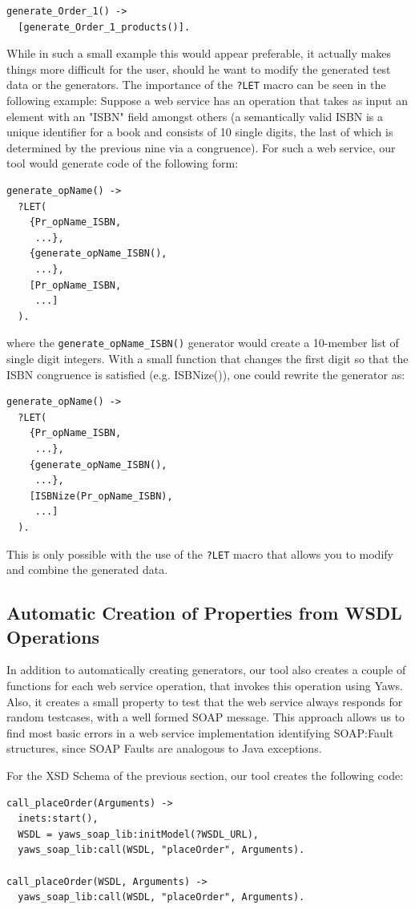 \documentclass[submission,copyright,a4]{eptcs}
\newcommand{\LET}{\texttt{?LET}\xspace}
\begin{document}
\begin{lstlisting}
generate_Order_1() ->
  [generate_Order_1_products()].
\end{lstlisting}

While in such a small example this would appear preferable, it actually makes things more 
difficult for the user, should he want to modify the generated test data or the generators. 
The importance of the \LET macro can be seen in the following example: Suppose a web service 
has an operation that takes as input an element with an "ISBN" field amongst others (a 
semantically valid ISBN is a unique identifier for a book and consists of 10 single digits, 
the last of which is determined by the previous nine via a congruence). For such a web service, 
our tool would generate code of the following form:
\begin{lstlisting}
generate_opName() ->
  ?LET(
    {Pr_opName_ISBN,
     ...},
    {generate_opName_ISBN(),
     ...},
    [Pr_opName_ISBN,
     ...]
  ).
\end{lstlisting}
where the \texttt{generate\_opName\_ISBN()} generator would create a
10-member list of single digit integers. With a small function that
changes the first digit so that the ISBN congruence is satisfied (e.g.
ISBNize()), one could rewrite the generator as:
\begin{lstlisting}
generate_opName() ->
  ?LET(
    {Pr_opName_ISBN,
     ...},
    {generate_opName_ISBN(),
     ...},
    [ISBNize(Pr_opName_ISBN),
     ...]
  ).
\end{lstlisting}

This is only possible with the use of the \LET macro that allows you to modify and combine the 
generated data. 

\subsection{Automatic Creation of Properties from WSDL Operations}

In addition to automatically creating generators, our tool also
creates a couple of functions for each web service operation, that
invokes this operation using Yaws. Also, it creates a small property
to test that the web service always responds for random testcases, with a
well formed SOAP message. This approach allows us to find most basic
errors in a web service implementation identifying SOAP:Fault
structures, since SOAP Faults are analogous to Java exceptions.

For the XSD Schema of the previous section, our tool creates the following code:
\begin{lstlisting}
call_placeOrder(Arguments) ->
  inets:start(),
  WSDL = yaws_soap_lib:initModel(?WSDL_URL),
  yaws_soap_lib:call(WSDL, "placeOrder", Arguments).
    
call_placeOrder(WSDL, Arguments) ->
  yaws_soap_lib:call(WSDL, "placeOrder", Arguments).
\end{lstlisting}
\end{document}
